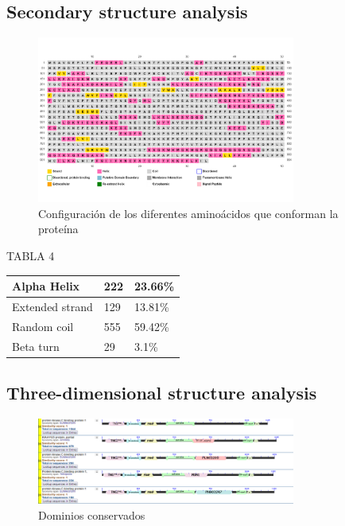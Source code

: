 \documentclass[journal,transmag]{IEEEtran}
\begin{document}
\subsection{\textbf{ Secondary structure analysis}}


\begin{figure}[!h]
	\center
	\includegraphics[width=8.5cm]{imagenes/secundaria.png}
	\caption{Configuración de los diferentes aminoácidos que conforman la proteína}
	\label{10}
\end{figure}


TABLA 4
\begin{table}[]
	\begin{tabular}{|l|l|l|}
	\hline
	Alpha Helix & 222 & 23.66\%  \\ \hline
	Extended strand & 129 & 13.81\%  \\ \hline
	Random coil& 555 & 59.42\%  \\ \hline
	Beta turn & 29 & 3.1\%  \\ \hline
	\end{tabular}
	\end{table}

\subsection{\textbf{ Three-dimensional structure analysis}}


\begin{figure}[!h]
	\center
	\includegraphics[width=8.5cm]{imagenes/dominios.png}
	\caption{Dominios conservados}
	\label{11}
\end{figure}
\end{document}
